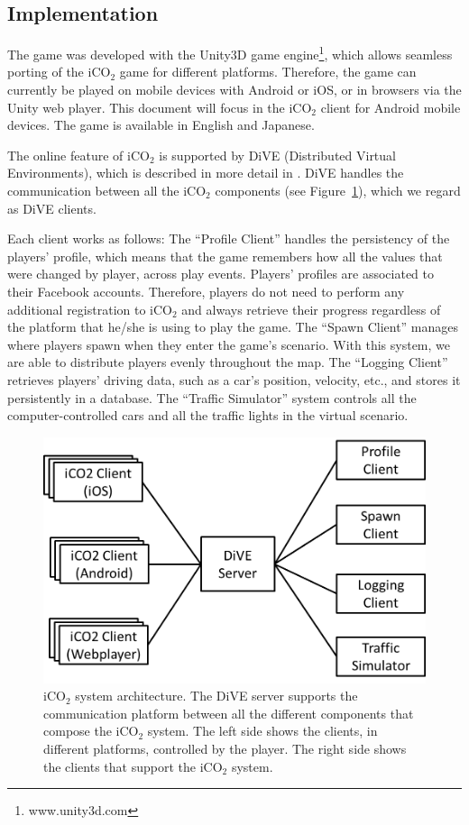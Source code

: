 \documentclass[preprint,authoryear,12pt]{elsarticle}
\begin{document}
\subsection{Implementation}

The game was developed with the Unity3D game engine\footnote{www.unity3d.com}, which allows seamless porting of the iCO$_2$ game for different platforms. Therefore, the game can currently be played on mobile devices with Android or iOS, or in browsers via the Unity web player. This document will focus in the iCO$_2$ client for Android mobile devices. The game is available in English and Japanese.

The online feature of iCO$_2$ is supported by DiVE (Distributed Virtual Environments), which is described in more detail in \cite{prendingeroliveira2014}. DiVE handles the communication between all the iCO$_2$ components (see Figure~\ref{fig:iCO2_generalarchitecture}), which we regard as DiVE clients.

Each client works as follows: The ``Profile Client'' handles the persistency of the players' profile, which means that the game remembers how all the values that were changed by player, across play events. Players' profiles are associated to their Facebook accounts. Therefore, players do not need to perform any additional registration to iCO$_2$ and always retrieve their progress regardless of the platform that he/she is using to play the game. The ``Spawn Client'' manages where players spawn when they enter the game's scenario. With this system, we are able to distribute players evenly throughout the map. The ``Logging Client'' retrieves players' driving data, such as a car's position, velocity, etc., and stores it persistently in a database. The ``Traffic Simulator'' system controls all the computer-controlled cars and all the traffic lights in the virtual scenario.

\begin{figure}[htb]
\begin{center}
\includegraphics[width=.6\linewidth]{ijhcs14-img/iCO2_generalarchitecture}
\caption{iCO$_2$ system architecture. The DiVE server supports the communication platform between all the different components that compose the iCO$_2$ system. The left side shows the clients, in different platforms, controlled by the player. The right side shows the clients that support the iCO$_2$ system.\label{fig:iCO2_generalarchitecture}}
\end{center}
\end{figure}
\end{document}
